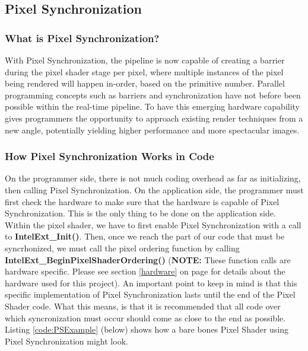 \documentclass[a4paper, 12pt]{article}
\begin{document}
\subsection{Pixel Synchronization}

\subsubsection{What is Pixel Synchronization?}

With Pixel Synchronization, the pipeline is now capable of creating a barrier
during the pixel shader stage per pixel, where multiple instances of the pixel
being rendered will happen in-order, based on the primitive number. Parallel
programming concepts such as barriers and synchronization have not before been
possible within the real-time pipeline. To have this emerging hardware
capability gives programmers the opportunity to approach existing render
techniques from a new angle, potentially yielding higher performance and more
spectacular images.

\subsubsection{How Pixel Synchronization Works in Code}

\nohyphens{On the programmer side, there is not much coding overhead as far as
initializing, then calling Pixel Synchronization. On the application side, the
programmer must first check the hardware to make sure that the hardware is
capable of Pixel Synchronization. This is the only thing to be done on the
application side. Within the pixel shader, we have to first enable Pixel
Synchronization with a call to \textbf{IntelExt\_Init()}. Then, once we reach
the part of our code that must be syncrhonized, we must call the pixel
ordering function by calling \textbf{IntelExt\_BeginPixelShaderOrdering()}
(\textbf{NOTE:} These function calls are hardware specific. Please see section
\ref{hardware} on page \pageref{hardware} for details about the hardware used
for this project). An important point to keep in mind is that this specific
implementation of Pixel Synchronization lasts until the end of the Pixel
Shader code. What this means, is that it is recommended that all code over
which syncronization must occur should come as close to the end as possible.
Listing \ref{code:PSExample} (below) shows how a bare bones Pixel Shader using
Pixel Synchronization might look.}
\end{document}

